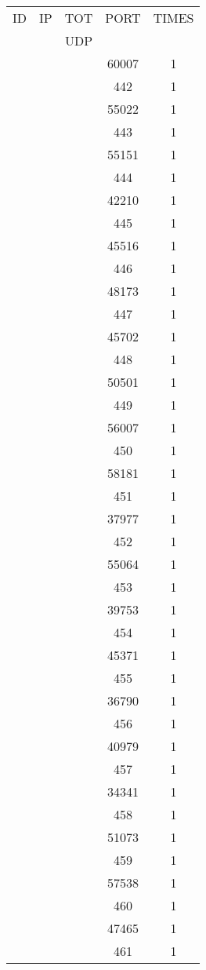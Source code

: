 \documentclass[a4paper]{scrartcl}
\begin{document}
\begin{minipage}[b]{0.5\linewidth}
\begin{tabular}{| c | c | c | c | c |}
\hline
ID & IP & TOT & PORT & TIMES \\ 
   &    & UDP &      &       \\ 
\hline
& & & 60007 & 1 \\ & & & 442 & 1 \\ & & & 55022 & 1 \\ & & & 443 & 1 \\ & & & 55151 & 1 \\ & & & 444 & 1 \\ & & & 42210 & 1 \\ & & & 445 & 1 \\ & & & 45516 & 1 \\ & & & 446 & 1 \\ & & & 48173 & 1 \\ & & & 447 & 1 \\ & & & 45702 & 1 \\ & & & 448 & 1 \\ & & & 50501 & 1 \\ & & & 449 & 1 \\ & & & 56007 & 1 \\ & & & 450 & 1 \\ & & & 58181 & 1 \\ & & & 451 & 1 \\ & & & 37977 & 1 \\ & & & 452 & 1 \\ & & & 55064 & 1 \\ & & & 453 & 1 \\ & & & 39753 & 1 \\ & & & 454 & 1 \\ & & & 45371 & 1 \\ & & & 455 & 1 \\ & & & 36790 & 1 \\ & & & 456 & 1 \\ & & & 40979 & 1 \\ & & & 457 & 1 \\ & & & 34341 & 1 \\ & & & 458 & 1 \\ & & & 51073 & 1 \\ & & & 459 & 1 \\ & & & 57538 & 1 \\ & & & 460 & 1 \\ & & & 47465 & 1 \\ & & & 461 & 1 \\ \hline\end{tabular}\end{minipage} \hfill\begin{minipage}[b]{0.5\linewidth}\begin{tabular}{| c | c | c | c | c |}

\end{tabular}
\end{minipage}
\end{document}
